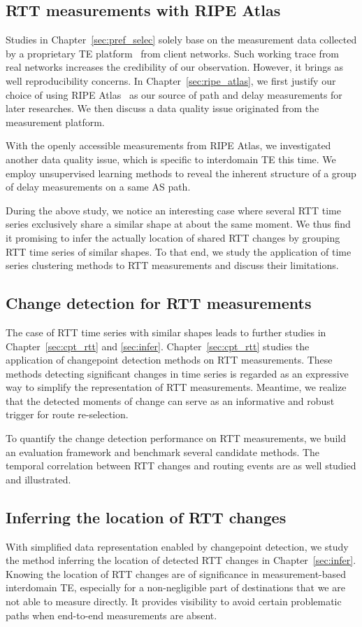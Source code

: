 \subsection{RTT measurements with RIPE Atlas}
Studies in Chapter~\ref{sec:pref_selec} solely base on the measurement data collected by a proprietary TE platform~\cite{b6} from client networks. Such working trace from real networks increases the credibility of our observation. However, it brings as well reproducibility concerns.
In Chapter~\ref{sec:ripe_atlas}, we first justify our choice of using RIPE Atlas~\cite{atlas} as our source of path and delay measurements for later researches.
We then discuss a data quality issue originated from the measurement platform.

With the openly accessible measurements from RIPE Atlas, we investigated another data quality issue, which is specific to interdomain TE this time. We employ unsupervised learning methods to reveal the inherent structure of a group of delay measurements on a same AS path.

During the above study, we notice an interesting case where several RTT time series exclusively share a similar shape at about the same moment.
We thus find it promising to infer the actually location of shared RTT changes by grouping RTT time series of similar shapes. To that end, we study the application of time series clustering methods to RTT measurements and discuss their limitations.

\subsection{Change detection for RTT measurements}
The case of RTT time series with similar shapes leads to further studies in Chapter~\ref{sec:cpt_rtt} and \ref{sec:infer}. Chapter~\ref{sec:cpt_rtt} studies the application of changepoint detection methods on RTT measurements. These methods detecting significant changes in time series is regarded as an expressive way to simplify the representation of RTT measurements. Meantime, we realize that the detected moments of change can serve as an informative and robust trigger for route re-selection.

To quantify the change detection performance on RTT measurements, we build an evaluation framework and benchmark several candidate methods.
The temporal correlation between RTT changes and routing events are as well studied and illustrated.

\subsection{Inferring the location of RTT changes}
With simplified data representation enabled by changepoint detection, we study the method inferring the location of detected RTT changes in Chapter~\ref{sec:infer}.
Knowing the location of RTT changes are of significance in measurement-based interdomain TE, especially for a non-negligible part of destinations that we are not able to measure directly. It provides visibility to avoid certain problematic paths when end-to-end measurements are absent.

